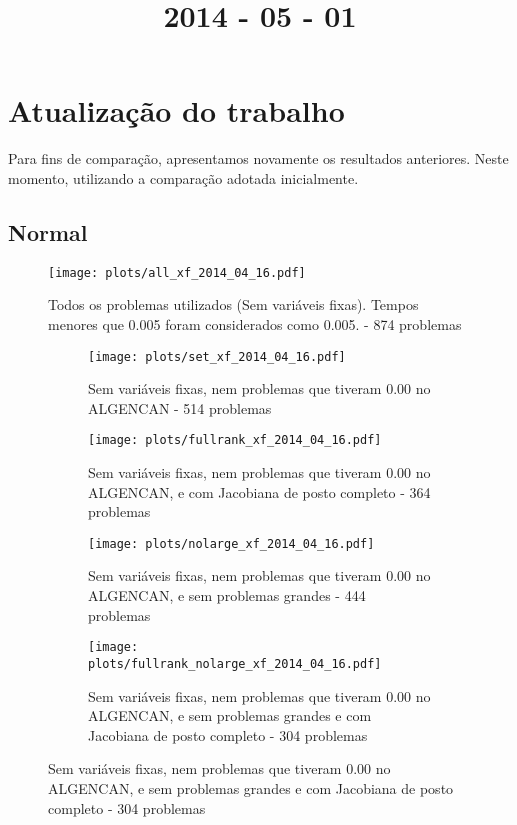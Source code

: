 \documentclass{article}
\title{2014 - 05 - 01}
\author{}
\date{}
\begin{document}
\maketitle
\section{Atualização do trabalho}

Para fins de comparação, apresentamos novamente os resultados anteriores. Neste
momento, utilizando a comparação adotada inicialmente.

\subsection{Normal}

\begin{figure}[H]
  \centering
  \texttt{[image: plots/all\_xf\_2014\_04\_16.pdf]}
  \caption{Todos os problemas utilizados (Sem variáveis fixas). Tempos menores
    que 0.005 foram considerados como 0.005. - 874 problemas}
\end{figure}
\begin{figure}[H]
  \centering
  \begin{subfigure}{0.48\textwidth}
    \texttt{[image: plots/set\_xf\_2014\_04\_16.pdf]}
    \caption{Sem variáveis fixas, nem problemas
      que tiveram 0.00 no ALGENCAN - 514 problemas}
  \end{subfigure}
  \begin{subfigure}{0.48\textwidth}
    \texttt{[image: plots/fullrank\_xf\_2014\_04\_16.pdf]}
    \caption{Sem variáveis fixas, nem problemas
      que tiveram 0.00 no ALGENCAN, e com Jacobiana de posto completo - 364
      problemas}
  \end{subfigure}
  \begin{subfigure}{0.48\textwidth}
    \texttt{[image: plots/nolarge\_xf\_2014\_04\_16.pdf]}
    \caption{Sem variáveis fixas, nem problemas
      que tiveram 0.00 no ALGENCAN, e sem problemas grandes - 444 problemas}
  \end{subfigure}
  \begin{subfigure}{0.48\textwidth}
    \texttt{[image: plots/fullrank\_nolarge\_xf\_2014\_04\_16.pdf]}
    \caption{Sem variáveis fixas, nem problemas
      que tiveram 0.00 no ALGENCAN, e sem problemas grandes e com Jacobiana de
      posto completo - 304 problemas}
  \end{subfigure}
\end{figure}
\end{document}
